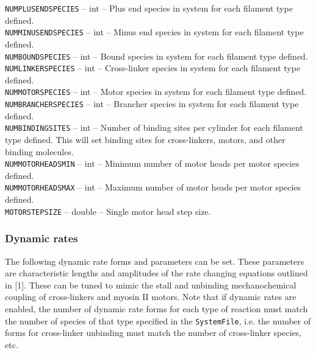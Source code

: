 \documentclass[11pt, oneside]{article}   	%
\begin{document}
     \noindent\texttt{NUMPLUSENDSPECIES} -- int -- Plus end species in system for each filament type defined. \\
   
     \noindent\texttt{NUMMINUSENDSPECIES} -- int -- Minus end species in system for each filament type defined. \\
   
     \noindent\texttt{NUMBOUNDSPECIES} -- int -- Bound species in system for each filament type defined. \\
   
      \noindent\texttt{NUMLINKERSPECIES} -- int -- Cross-linker species in system for each filament type defined.  \\
   
       \noindent\texttt{NUMMOTORSPECIES} -- int -- Motor species in system for each filament type defined. \\
   
       \noindent\texttt{NUMBRANCHERSPECIES} -- int -- Brancher species in system for each filament type defined. \\
   
       \noindent\texttt{NUMBINDINGSITES} -- int -- Number of binding sites per cylinder for each filament type defined. 
       This will set binding sites for cross-linkers, motors, and other binding molecules. \\
   
       \noindent\texttt{NUMMOTORHEADSMIN} -- int -- Minimum number of motor heads per motor species defined. \\
     
       \noindent\texttt{NUMMOTORHEADSMAX} -- int -- Maximum number of motor heads per motor species defined. \\
     
       \noindent\texttt{MOTORSTEPSIZE} -- double -- Single motor head step size. \\
     

\normalsize

\subsubsection{Dynamic rates}

The following dynamic rate forms and parameters can be set. These parameters are characteristic lengths and amplitudes of the rate changing equations outlined in [1]. These can be tuned to mimic the stall and unbinding mechanochemical coupling of cross-linkers and myosin II motors. Note that if dynamic rates are enabled, the number of dynamic rate forms for each type of reaction must match the number of species of that type specified in the \texttt{SystemFile}, i.e. the number of forms for cross-linker unbinding must match the number of cross-linker species, etc.\\
\end{document}
